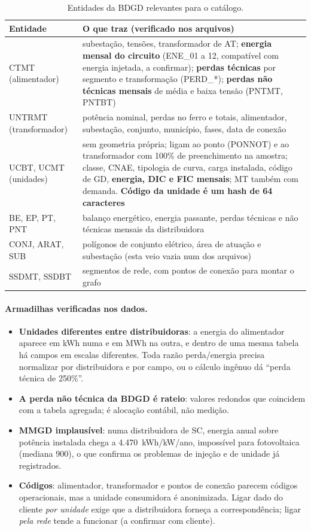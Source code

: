 \begin{table}[H]
\centering\small
\begin{tabularx}{\textwidth}{P{3.2cm} L}
\toprule
\textbf{Entidade} & \textbf{O que traz (verificado nos arquivos)} \\
\midrule
CTMT (alimentador) & subestação, tensões, transformador de AT; \textbf{energia mensal do circuito} (ENE\_01 a 12, compatível com energia injetada, a confirmar); \textbf{perdas técnicas} por segmento e transformação (PERD\_*); \textbf{perdas não técnicas mensais} de média e baixa tensão (PNTMT, PNTBT) \\
UNTRMT (transformador) & potência nominal, perdas no ferro e totais, alimentador, subestação, conjunto, município, fases, data de conexão \\
UCBT, UCMT (unidades) & sem geometria própria; ligam ao ponto (PONNOT) e ao transformador com 100\% de preenchimento na amostra; classe, CNAE, tipologia de curva, carga instalada, código de GD, \textbf{energia, DIC e FIC mensais}; MT também com demanda. \textbf{Código da unidade é um hash de 64 caracteres} \\
BE, EP, PT, PNT & balanço energético, energia passante, perdas técnicas e não técnicas mensais da distribuidora \\
CONJ, ARAT, SUB & polígonos de conjunto elétrico, área de atuação e subestação (esta veio vazia num dos arquivos) \\
SSDMT, SSDBT & segmentos de rede, com pontos de conexão para montar o grafo \\
\bottomrule
\end{tabularx}
\caption{Entidades da BDGD relevantes para o catálogo.}
\end{table}

\paragraph{Armadilhas verificadas nos dados.}
\begin{itemize}
  \item \textbf{Unidades diferentes entre distribuidoras}: a energia do
    alimentador aparece em kWh numa e em MWh na outra, e dentro de uma mesma
    tabela há campos em escalas diferentes. Toda razão perda/energia precisa
    normalizar por distribuidora e por campo, ou o cálculo ingênuo dá
    ``perda técnica de 250\%''.
  \item \textbf{A perda não técnica da BDGD é rateio}: valores redondos que
    coincidem com a tabela agregada; é alocação contábil, não medição.
  \item \textbf{MMGD implausível}: numa distribuidora de SC, energia anual
    sobre potência instalada chega a 4.470~kWh/kW/ano, impossível para
    fotovoltaica (mediana 900), o que confirma os problemas de injeção e de
    unidade já registrados.
  \item \textbf{Códigos}: alimentador, transformador e pontos de conexão
    parecem códigos operacionais, mas a unidade consumidora é anonimizada.
    Ligar dado do cliente \emph{por unidade} exige que a distribuidora
    forneça a correspondência; ligar \emph{pela rede} tende a funcionar (a
    confirmar com cliente).
\end{itemize}

